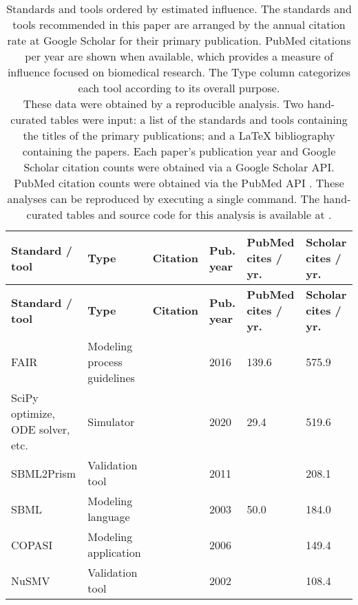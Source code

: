 
\begin{longtable}{ |m{2.2cm}|m{5cm}|m{1.2cm}|m{1cm}|m{1.2cm}|m{1cm}| } 
\caption{Standards and tools ordered by estimated influence.
The standards and tools recommended in this paper are arranged by the annual citation rate at Google Scholar for their
primary publication.
PubMed citations per year are shown when available, which provides a measure of influence focused on biomedical research.
The Type column categorizes each tool according to its overall purpose.\\
These data were obtained by a reproducible analysis.
Two hand-curated tables were input: a list of the standards and tools containing the titles of the primary publications; and a LaTeX bibliography containing the papers.
Each paper's publication year and Google Scholar citation counts were obtained via a Google Scholar API.
PubMed citation counts were obtained via the PubMed API \cite{sayers2010general}.
These analyses can be reproduced by executing a single command.
The hand-curated tables and source code for this analysis is available at \cite{GoldbergReproToolsAnalysis}.
}\\\hline
\textbf{\scriptsize{Standard / tool}} &\textbf{\scriptsize{Type}} &\textbf{\scriptsize{Citation}} &\textbf{\scriptsize{Pub. year}} &\textbf{\scriptsize{PubMed cites / yr.}} &\textbf{\scriptsize{Scholar cites / yr.}}\\ 
\hline
\endfirsthead\hline
\textbf{\scriptsize{Standard / tool}} &\textbf{\scriptsize{Type}} &\textbf{\scriptsize{Citation}} &\textbf{\scriptsize{Pub. year}} &\textbf{\scriptsize{PubMed cites / yr.}} &\textbf{\scriptsize{Scholar cites / yr.}}\\ 
\hline
\endhead\small{FAIR} &\small{Modeling process guidelines} &\cite{Wilkinson2016TheStewardship.} &\small{2016} &\small{139.6} &\small{575.9}\\
\hline
\small{SciPy optimize, ODE solver, etc.} &\small{Simulator} &\cite{virtanen2020scipy} &\small{2020} &\small{29.4} &\small{519.6}\\
\hline
\small{SBML2Prism} &\small{Validation tool} &\cite{Kwiatkowska2011PRISMSystems} &\small{2011} &\small{} &\small{208.1}\\
\hline
\small{SBML} &\small{Modeling language} &\cite{Hucka2003TheModels} &\small{2003} &\small{50.0} &\small{184.0}\\
\hline
\small{COPASI} &\small{Modeling application} &\cite{Hoops2006COPASI--aSImulator} &\small{2006} &\small{} &\small{149.4}\\
\hline
\small{NuSMV} &\small{Validation tool} &\cite{Cimatti2002NuSMVChecking} &\small{2002} &\small{} &\small{108.4}\\

\end{longtable}
